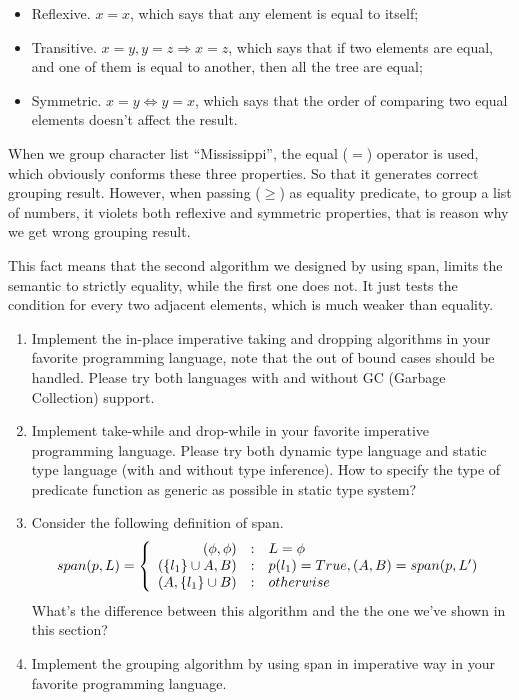 \documentclass[UTF8]{article}
\begin{document}
\begin{itemize}
\item Reflexive. $x = x$, which says that any element is equal to itself;
\item Transitive. $x = y, y = z \Rightarrow x = z$, which says that if two elements are equal, and one of them is equal to another, then all the tree are equal;
\item Symmetric. $x = y \Leftrightarrow y = x$, which says that the order of comparing two equal elements doesn't affect the result.
\end{itemize}

When we group character list ``Mississippi'', the equal ($=$) operator is used, which obviously conforms these
three properties. So that it generates correct grouping result. However, when passing ($\geq$) as equality predicate,
to group a list of numbers, it violets both reflexive and symmetric properties, that is reason why we get wrong grouping result.

This fact means that the second algorithm we designed by using span, limits the semantic to strictly equality, while the
first one does not. It just tests the condition for every two adjacent elements, which is much weaker than equality.

\begin{Exercise}
\begin{enumerate}
\item Implement the in-place imperative taking and dropping algorithms in your favorite programming language, note that
the out of bound cases should be handled. Please try both languages with and without GC (Garbage Collection) support.
\item Implement take-while and drop-while in your favorite imperative programming language. Please try both dynamic
type language and static type language (with and without type inference). How to specify the type of predicate function
as generic as possible in static type system?
\item Consider the following definition of span.
\[
span(p, L) =  \left \{
  \begin{array}
  {r@{\quad:\quad}l}
  (\phi, \phi) & L = \phi \\
  (\{ l_1 \} \cup A, B) & p(l_1) = True, (A, B) = span(p, L') \\
  (A, \{l_1\} \cup B) & otherwise
  \end{array}
\right.
\]
What's the difference between this algorithm and the the one we've shown in this section?
\item Implement the grouping algorithm by using span in imperative way in your favorite programming language.
\end{enumerate}
\end{Exercise}
\end{document}
